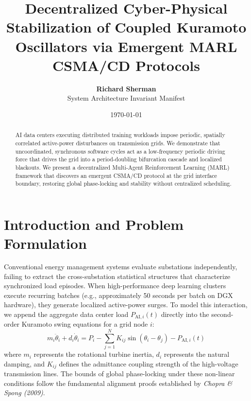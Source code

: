 \documentclass[11pt,fleqn]{article}
\title{\textbf{Decentralized Cyber-Physical Stabilization of Coupled Kuramoto Oscillators via Emergent MARL CSMA/CD Protocols}}
\author{\textbf{Richard Sherman} \\ System Architecture Invariant Manifest}
\date{\today}
\begin{document}
\maketitle

\begin{abstract}
AI data centers executing distributed training workloads impose periodic, spatially correlated active-power disturbances on transmission grids. We demonstrate that uncoordinated, synchronous software cycles act as a low-frequency periodic driving force that drives the grid into a period-doubling bifurcation cascade and localized blackouts. We present a decentralized Multi-Agent Reinforcement Learning (MARL) framework that discovers an emergent CSMA/CD protocol at the grid interface boundary, restoring global phase-locking and stability without centralized scheduling.
\end{abstract}

\section{Introduction and Problem Formulation}
Conventional energy management systems evaluate substations independently, failing to extract the cross-substation statistical structures that characterize synchronized load episodes. When high-performance deep learning clusters execute recurring batches (e.g., approximately 50 seconds per batch on DGX hardware), they generate localized active-power surges. To model this interaction, we append the aggregate data center load $P_{\text{AI}, i}(t)$ directly into the second-order Kuramoto swing equations for a grid node $i$:
\begin{equation}
m_i \ddot{\theta}_i + d_i \dot{\theta}_i = P_i - \sum_{j=1}^{N} K_{ij} \sin(\theta_i - \theta_j) - P_{\text{AI}, i}(t)
\end{equation}
where $m_i$ represents the rotational turbine inertia, $d_i$ represents the natural damping, and $K_{ij}$ defines the admittance coupling strength of the high-voltage transmission lines. The bounds of global phase-locking under these non-linear conditions follow the fundamental alignment proofs established by \textit{Chopra \& Spong (2009)}.
\end{document}
